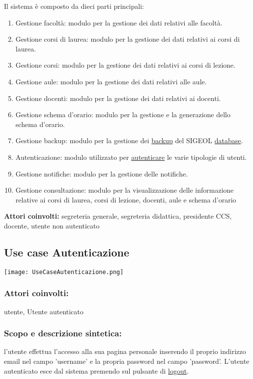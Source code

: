 \documentclass[11pt,a4paper]{article}
\begin{document}
Il sistema è composto da dieci parti principali:
\begin{enumerate}
\item Gestione facoltà: modulo per la gestione dei dati relativi alle facoltà. 
\item Gestione corsi di laurea: modulo per la gestione dei dati relativi ai corsi di laurea.
\item Gestione corsi: modulo per la gestione dei dati relativi ai corsi di lezione.
\item Gestione aule: modulo per la gestione dei dati relativi alle aule.
\item Gestione docenti: modulo per la gestione dei dati relativi ai docenti.
\item Gestione schema d'orario: modulo per la gestione e la generazione dello schema d'orario.
\item Gestione backup: modulo per la gestione dei \underline{backup} del SIGEOL \underline{database}.
\item Autenticazione: modulo utilizzato per \underline{autenticare} le varie tipologie di utenti.
\item Gestione notifiche: modulo per la gestione delle notifiche.
\item Gestione consultazione: modulo per la visualizzazione delle informazione relative ai corsi di laurea, corsi di lezione, docenti, aule e schema d'orario
\end{enumerate}
\textbf{Attori coinvolti:}
segreteria generale, segreteria didattica, presidente CCS, docente, utente non autenticato
\subsection{Use case Autenticazione}
\begin{center} 
 \texttt{[image: UseCaseAutenticazione.png]}
\end{center}
\subsubsection*{Attori coinvolti:}
utente, Utente autenticato
\subsubsection*{Scopo e descrizione sintetica:}
l'utente effettua l'accesso alla sua pagina personale inserendo il proprio indirizzo email nel campo 'username' e la propria password
nel campo 'password'.
L'utente autenticato esce dal sistema premendo sul pulsante di \underline{logout}.
\end{document}
